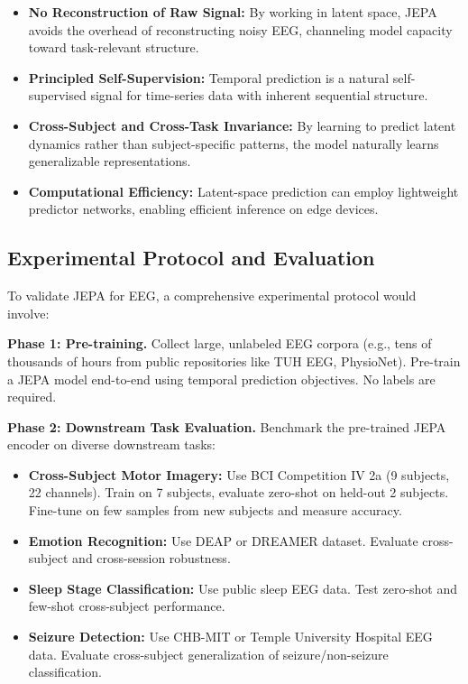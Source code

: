 \documentclass[11pt]{article}
\begin{document}
\begin{itemize}
    \item \textbf{No Reconstruction of Raw Signal:} By working in latent space, JEPA avoids the overhead of reconstructing noisy EEG, channeling model capacity toward task-relevant structure.
    
    \item \textbf{Principled Self-Supervision:} Temporal prediction is a natural self-supervised signal for time-series data with inherent sequential structure.
    
    \item \textbf{Cross-Subject and Cross-Task Invariance:} By learning to predict latent dynamics rather than subject-specific patterns, the model naturally learns generalizable representations.
    
    \item \textbf{Computational Efficiency:} Latent-space prediction can employ lightweight predictor networks, enabling efficient inference on edge devices.
\end{itemize}

\subsection{Experimental Protocol and Evaluation}

To validate JEPA for EEG, a comprehensive experimental protocol would involve:

\textbf{Phase 1: Pre-training.} Collect large, unlabeled EEG corpora (e.g., tens of thousands of hours from public repositories like TUH EEG, PhysioNet). Pre-train a JEPA model end-to-end using temporal prediction objectives. No labels are required.

\textbf{Phase 2: Downstream Task Evaluation.} Benchmark the pre-trained JEPA encoder on diverse downstream tasks:
\begin{itemize}
    \item \textbf{Cross-Subject Motor Imagery:} Use BCI Competition IV 2a (9 subjects, 22 channels). Train on 7 subjects, evaluate zero-shot on held-out 2 subjects. Fine-tune on few samples from new subjects and measure accuracy.
    
    \item \textbf{Emotion Recognition:} Use DEAP or DREAMER dataset. Evaluate cross-subject and cross-session robustness.
    
    \item \textbf{Sleep Stage Classification:} Use public sleep EEG data. Test zero-shot and few-shot cross-subject performance.
    
    \item \textbf{Seizure Detection:} Use CHB-MIT or Temple University Hospital EEG data. Evaluate cross-subject generalization of seizure/non-seizure classification.
\end{itemize}
\end{document}
